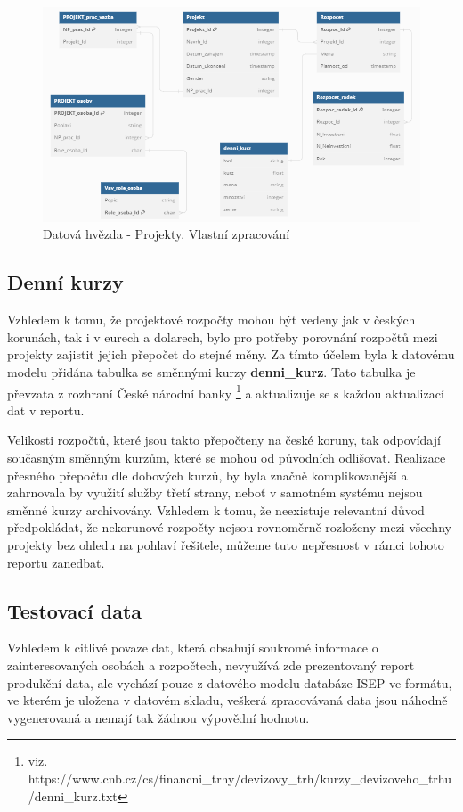 \documentclass[
  digital,     %
  twoside,     %
  lof,         %
  lot,         %
]{fithesis4}
\begin{document}
    \begin{figure}[t]
        \begin{center}
            \includegraphics[width=13cm]{img/projects_sch.png}
        \end{center}
        \caption{Datová hvězda - Projekty. Vlastní zpracování}
        \label{fig:projects_sch}
    \end{figure} 

\subsection{Denní kurzy}
\label{denni-kurz}
Vzhledem k tomu, že projektové rozpočty mohou být vedeny jak v českých korunách, tak i v eurech a dolarech, bylo pro potřeby porovnání rozpočtů mezi projekty zajistit jejich přepočet do stejné měny. Za tímto účelem byla k datovému modelu přidána tabulka se směnnými kurzy \textbf{denni\_kurz}. Tato tabulka je převzata z rozhraní České národní banky \footnote{viz. https://www.cnb.cz/cs/financni\_trhy/devizovy\_trh/kurzy\_devizoveho\_trhu/denni\_kurz.txt} a aktualizuje se s každou aktualizací dat v reportu. 

Velikosti rozpočtů, které jsou takto přepočteny na české koruny, tak odpovídají současným směnným kurzům, které se mohou od původních odlišovat. Realizace přesného přepočtu dle dobových kurzů, by byla značně komplikovanější a zahrnovala by využití služby třetí strany, neboť v samotném systému nejsou směnné kurzy archivovány. Vzhledem k tomu, že neexistuje relevantní důvod předpokládat, že nekorunové rozpočty nejsou rovnoměrně rozloženy mezi všechny projekty bez ohledu na pohlaví řešitele, můžeme tuto nepřesnost v rámci tohoto reportu zanedbat.

\subsection{Testovací data}
\label{testovaci-data}
Vzhledem k citlivé povaze dat, která obsahují soukromé informace o zainteresovaných osobách a rozpočtech, nevyužívá zde prezentovaný report produkční data, ale vychází pouze z datového modelu databáze ISEP ve formátu, ve kterém je uložena v datovém skladu, veškerá zpracovávaná data jsou náhodně vygenerovaná a nemají tak žádnou výpovědní hodnotu. 
\end{document}
